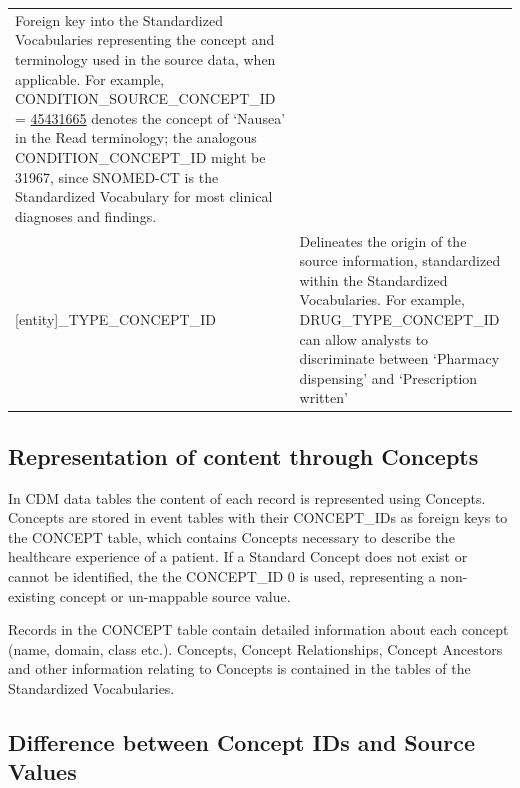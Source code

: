 \documentclass[]{book}
\begin{document}
\begin{longtable}[]{@{}ll@{}}
\begin{minipage}[t]{0.70\columnwidth}
Foreign key into the Standardized Vocabularies representing the concept
and terminology used in the source data, when applicable. For example,
CONDITION\_SOURCE\_CONCEPT\_ID =
\href{http://athena.ohdsi.org/search-terms/terms/45431665}{45431665}
denotes the concept of `Nausea' in the Read terminology; the analogous
CONDITION\_CONCEPT\_ID might be 31967, since SNOMED-CT is the
Standardized Vocabulary for most clinical diagnoses and findings.\strut
\end{minipage}\tabularnewline
\begin{minipage}[t]{0.24\columnwidth}\raggedright\strut
{[}entity{]}\_TYPE\_CONCEPT\_ID\strut
\end{minipage} & \begin{minipage}[t]{0.70\columnwidth}\raggedright\strut
Delineates the origin of the source information, standardized within the
Standardized Vocabularies. For example, DRUG\_TYPE\_CONCEPT\_ID can
allow analysts to discriminate between `Pharmacy dispensing' and
`Prescription written'\strut
\end{minipage}\tabularnewline
\bottomrule
\end{longtable}

\subsection{Representation of content through
Concepts}\label{representation-of-content-through-concepts}

In CDM data tables the content of each record is represented using
Concepts. Concepts are stored in event tables with their CONCEPT\_IDs as
foreign keys to the CONCEPT table, which contains Concepts necessary to
describe the healthcare experience of a patient. If a Standard Concept
does not exist or cannot be identified, the the CONCEPT\_ID 0 is used,
representing a non-existing concept or un-mappable source value.

Records in the CONCEPT table contain detailed information about each
concept (name, domain, class etc.). Concepts, Concept Relationships,
Concept Ancestors and other information relating to Concepts is
contained in the tables of the Standardized Vocabularies.

\subsection{Difference between Concept IDs and Source
Values}\label{difference-between-concept-ids-and-source-values}
\end{document}

